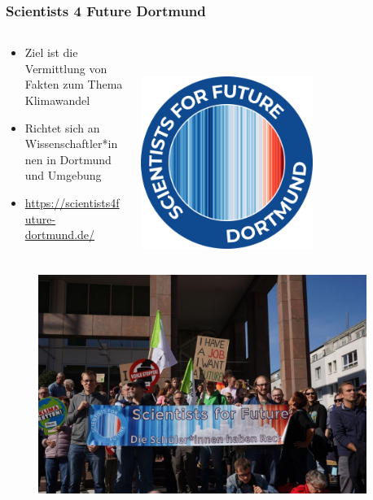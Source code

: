 \begin{frame}
\frametitle{Scientists 4 Future Dortmund}
\begin{columns}[c] %
 \begin{column}{.78\textwidth}
	 \begin{itemize}
		\item Ziel ist die Vermittlung von Fakten zum Thema Klimawandel
		\item Richtet sich an Wissenschaftler*innen in Dortmund und Umgebung
	 	\item \url{https://scientists4future-dortmund.de/}
	 \end{itemize}
 \end{column}%
 \hfill%
 \begin{column}{.28\textwidth}
	 \centering
	 ~\\~\\
		 \includegraphics[width=0.625\textwidth]{bilder/s4f_logo_dortmund.png}
 \end{column}%
\end{columns}
\begin{columns}[c] %
 \begin{column}{.48\textwidth}
	 \centering
	 \begin{figure}
		 \centering
		 \includegraphics[width=0.95\textwidth]{bilder/demo.jpg}

\end{figure}
\end{column}
\end{columns}
\end{frame}
